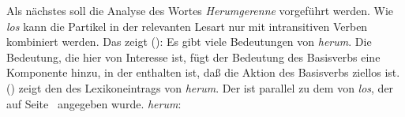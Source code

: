 Als nächstes soll die Analyse des Wortes \emph{Herumgerenne} vorgeführt werden.
Wie \emph{los} kann die Partikel  in der relevanten Lesart nur mit intransitiven Verben kombiniert werden.
Das zeigt ():
\eal
{}
\zl
Es gibt viele Bedeutungen von \emph{herum}. Die Bedeutung,
die hier von Interesse ist, fügt der Bedeutung des Basisverbs
eine Komponente hinzu, in der enthalten ist, daß die Aktion
des Basisverbs ziellos ist.
() zeigt den \locw des Lexikoneintrags von \emph{herum}.
Der \locw ist parallel zu dem von \emph{los}, der auf Seite~\pageref{le-los-asp}
angegeben wurde.
%
\eas
\label{le-herum-part}
\mbox{\emph{herum}:}\\
\zs

